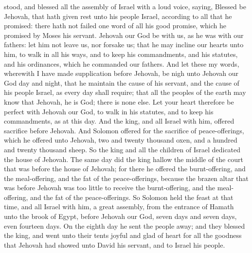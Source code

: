 stood, and blessed all the assembly of Israel with a loud voice, saying, Blessed be Jehovah, that hath given rest unto his people Israel, according to all that he promised: there hath not failed one word of all his good promise, which he promised by Moses his servant. Jehovah our God be with us, as he was with our fathers: let him not leave us, nor forsake us; that he may incline our hearts unto him, to walk in all his ways, and to keep his commandments, and his statutes, and his ordinances, which he commanded our fathers. And let these my words, wherewith I have made supplication before Jehovah, be nigh unto Jehovah our God day and night, that he maintain the cause of his servant, and the cause of his people Israel, as every day shall require; that all the peoples of the earth may know that Jehovah, he is God; there is none else. Let your heart therefore be perfect with Jehovah our God, to walk in his statutes, and to keep his commandments, as at this day.  And the king, and all Israel with him, offered sacrifice before Jehovah. And Solomon offered for the sacrifice of peace-offerings, which he offered unto Jehovah, two and twenty thousand oxen, and a hundred and twenty thousand sheep. So the king and all the children of Israel dedicated the house of Jehovah. The same day did the king hallow the middle of the court that was before the house of Jehovah; for there he offered the burnt-offering, and the meal-offering, and the fat of the peace-offerings, because the brazen altar that was before Jehovah was too little to receive the burnt-offering, and the meal-offering, and the fat of the peace-offerings. So Solomon held the feast at that time, and all Israel with him, a great assembly, from the entrance of Hamath unto the brook of Egypt, before Jehovah our God, seven days and seven days, even fourteen days. On the eighth day he sent the people away; and they blessed the king, and went unto their tents joyful and glad of heart for all the goodness that Jehovah had showed unto David his servant, and to Israel his people. 

